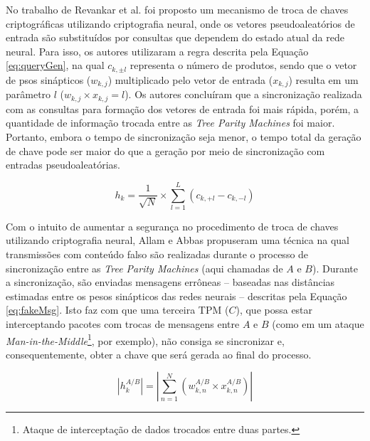 \documentclass[12pt]{article}
\begin{document}
        No trabalho de Revankar et al. \cite{revankar2010private} foi proposto um mecanismo de troca de chaves criptográficas utilizando criptografia neural, onde os vetores pseudoaleatórios de entrada são substituídos por consultas que dependem do estado atual da rede neural. Para isso, os autores utilizaram a regra descrita pela Equação \eqref{eq:queryGen}, na qual $c_{k, \pm l}$ representa o número de produtos, sendo que o vetor de psos sinápticos ($w_{k,j}$) multiplicado pelo vetor de entrada ($x_{k,j}$) resulta em um parâmetro $l$ ($w_{k,j} \times x_{k,j} = l$). Os autores concluíram que a sincronização realizada com as consultas para formação dos vetores de entrada foi mais rápida, porém, a quantidade de informação trocada entre as \textit{Tree Parity Machines} foi maior. Portanto, embora o tempo de sincronização seja menor, o tempo total da geração de chave pode ser maior do que a geração por meio de sincronização com entradas pseudoaleatórias.
        
        \begin{equation}
            \label{eq:queryGen}
            h_k = \frac{1}{\sqrt{N}} \times \displaystyle\sum_{l=1}^{L} (c_{k, +l} - c_{k, -l})
        \end{equation}

        Com o intuito de aumentar a segurança no procedimento de troca de chaves utilizando criptografia neural, Allam e Abbas \cite{allam2010improvement} propuseram uma técnica na qual transmissões com conteúdo falso são realizadas durante o processo de sincronização entre as \textit{Tree Parity Machines} (aqui chamadas de $A$ e $B$). Durante a sincronização, são enviadas mensagens errôneas -- baseadas nas distâncias estimadas entre os pesos sinápticos das redes neurais -- descritas pela Equação \eqref{eq:fakeMsg}. Isto faz com que uma terceira TPM ($C$), que possa estar interceptando pacotes com trocas de mensagens entre $A$ e $B$ (como em um ataque \textit{Man-in-the-Middle}\footnote{Ataque de interceptação de dados trocados entre duas partes.}, por exemplo), não consiga se sincronizar e, consequentemente, obter a chave que será gerada ao final do processo.
        
        \begin{equation}
            \label{eq:fakeMsg}
            \left | h_{k}^{A/B} \right | = \left | \displaystyle\sum_{n=1}^{N} (w_{k, n}^{A/B} \times x_{k, n}^{A/B}) \right |
        \end{equation}
\end{document}
